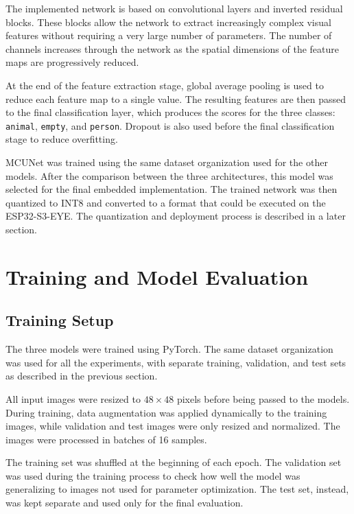 \documentclass{article}
\begin{document}
The implemented network is based on convolutional layers and inverted
residual blocks. These blocks allow the network to extract increasingly
complex visual features without requiring a very large number of
parameters. The number of channels increases through the network as the
spatial dimensions of the feature maps are progressively reduced.

At the end of the feature extraction stage, global average pooling is used
to reduce each feature map to a single value. The resulting features are
then passed to the final classification layer, which produces the scores
for the three classes: \texttt{animal}, \texttt{empty}, and
\texttt{person}. Dropout is also used before the final classification stage
to reduce overfitting.

MCUNet was trained using the same dataset organization used for the other
models. After the comparison between the three architectures, this model
was selected for the final embedded implementation. The trained network was
then quantized to INT8 and converted to a format that could be executed on
the ESP32-S3-EYE. The quantization and deployment process is described in
a later section.

\section{Training and Model Evaluation}
\label{sec:training-evaluation}

\subsection{Training Setup}
\label{subsec:training-setup}

The three models were trained using PyTorch. The same dataset organization
was used for all the experiments, with separate training, validation, and
test sets as described in the previous section.

All input images were resized to $48 \times 48$ pixels before being passed
to the models. During training, data augmentation was applied dynamically
to the training images, while validation and test images were only resized
and normalized. The images were processed in batches of 16 samples.

The training set was shuffled at the beginning of each epoch. The validation
set was used during the training process to check how well the model was
generalizing to images not used for parameter optimization. The test set,
instead, was kept separate and used only for the final evaluation.
\end{document}
